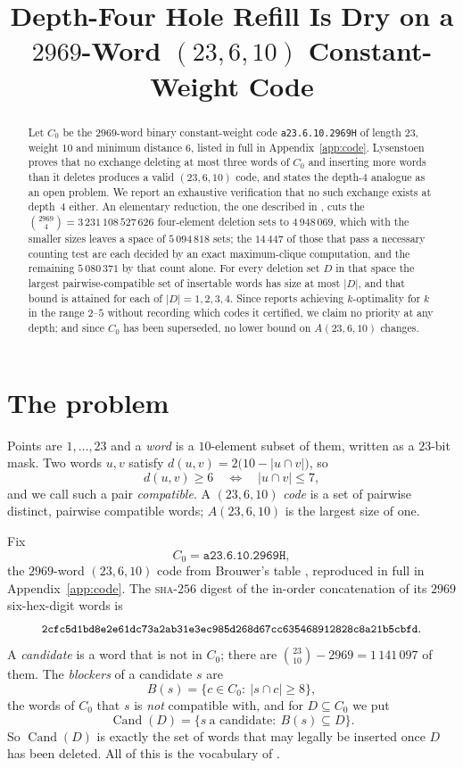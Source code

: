 \documentclass[11pt]{amsart}
\title[Depth-four hole refill is dry]
{Depth-Four Hole Refill Is Dry on a $2969$-Word $(23,6,10)$ Constant-Weight Code}
\date{}
\theoremstyle{remark}
\DeclareMathOperator{\Cand}{Cand}
\begin{document}
\begin{abstract}
Let $C_0$ be the $2969$-word binary constant-weight code \texttt{a23.6.10.2969H} of length
$23$, weight $10$ and minimum distance $6$, listed in full in Appendix~\ref{app:code}.
Lysenstoen \cite{Lys} proves that no exchange deleting at most three words of $C_0$ and
inserting more words than it deletes produces a valid $(23,6,10)$ code, and states the
depth-$4$ analogue as an open problem. We report an exhaustive verification that no such
exchange exists at depth~$4$ either. An elementary reduction, the one described in
\cite[\S XII]{BSSS}, cuts the $\binom{2969}{4}=3\,231\,108\,527\,626$ four-element deletion
sets to $4\,948\,069$, which with the smaller sizes leaves a space of $5\,094\,818$ sets; the
$14\,447$ of those that pass a necessary counting test are each decided by an exact
maximum-clique computation, and the remaining $5\,080\,371$ by that count alone. For every
deletion set $D$ in that space the largest pairwise-compatible set of insertable words has
size at most $|D|$, and that bound is attained for each of $|D|=1,2,3,4$. Since
\cite[\S XII]{BSSS} reports achieving $k$-optimality for $k$ in the range $2$--$5$ without
recording which codes it certified, we claim no priority at any depth; and since $C_0$ has
been superseded, no lower bound on $A(23,6,10)$ changes.
\end{abstract}

\maketitle

\section{The problem}\label{sec:intro}

Points are $1,\dots,23$ and a \emph{word} is a $10$-element subset of them, written as a
$23$-bit mask. Two words $u,v$ satisfy $d(u,v)=2\bigl(10-|u\cap v|\bigr)$, so
\begin{equation}\label{eq:compat}
 d(u,v)\ge 6
 \quad\Longleftrightarrow\quad
 |u\cap v|\le 7 ,
\end{equation}
and we call such a pair \emph{compatible}. A $(23,6,10)$ \emph{code} is a set of pairwise
distinct, pairwise compatible words; $A(23,6,10)$ is the largest size of one.

Fix
\[
 C_0=\texttt{a23.6.10.2969H},
\]
the $2969$-word $(23,6,10)$ code from Brouwer's table \cite{AEB}, reproduced in full in
Appendix~\ref{app:code}. The \textsc{sha}-$256$ digest of the in-order concatenation of its
$2969$ six-hex-digit words is
\[
 \text{\small\texttt{2cfc5d1bd8e2e61dc73a2ab31e3ec985d268d67cc635468912828c8a21b5cbfd}}.
\]
A \emph{candidate} is a word that is not in $C_0$; there are
$\binom{23}{10}-2969=1\,141\,097$ of them. The \emph{blockers} of a candidate $s$ are
\[
 B(s)=\{c\in C_0:\ |s\cap c|\ge 8\},
\]
the words of $C_0$ that $s$ is \emph{not} compatible with, and for $D\subseteq C_0$ we put
\[
 \Cand(D)=\{s\ \text{a candidate}:\ B(s)\subseteq D\}.
\]
So $\Cand(D)$ is exactly the set of words that may legally be inserted once $D$ has been
deleted. All of this is the vocabulary of \cite{Lys}.
\end{document}
